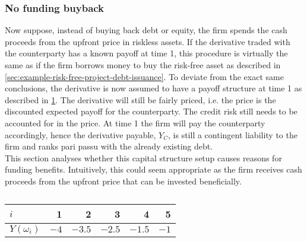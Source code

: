 \documentclass[../main.tex]{subfiles}
\begin{document}
        \subsubsection{No funding buyback}
            Now suppose, instead of buying back debt or equity, 
            the firm spends the cash proceeds from the upfront price in riskless assets. 
            If the derivative traded with the counterparty has a known payoff at time 1, this procedure is virtually the same as if the firm borrows money to buy the risk-free asset 
            as described in \cref{sec:example-risk-free-project-debt-issuance}. 
            To deviate from the exact same conclusions, the derivative is now assumed to have a payoff structure at time 1 
            as described in \cref{tbl:risky-option-payoff}. 
            The derivative will still be fairly priced, i.e. the price is the discounted expected payoff for the counterparty. 
            The credit risk still needs to be accounted for in the price. 
            At time 1 the firm will pay the counterparty accordingly, hence the derivative payable, $Y_C$, 
            is still a contingent liability to the firm and ranks pari passu with the already existing debt.
            \\
            This section analyses whether this capital structure setup causes reasons for funding benefits.
            Intuitively, this could seem appropriate as the firm receives cash proceeds from the upfront price that can be invested beneficially.
            
            \begin{table}[H]
                \centering
                \begin{tabular}{l|rrrrr}
                    $i$ & 1 & 2 & 3 & 4 & 5 \\
                    \hline
                    $Y(\omega_{i})$ & $\num{-4}$ & $\num{-3.5}$ & $\num{-2.5}$ & $\num{-1.5}$ & $\num{-1}$ \\
                \end{tabular}
                \caption{}
                \label{tbl:risky-option-payoff}
            \end{table}
\end{document}
